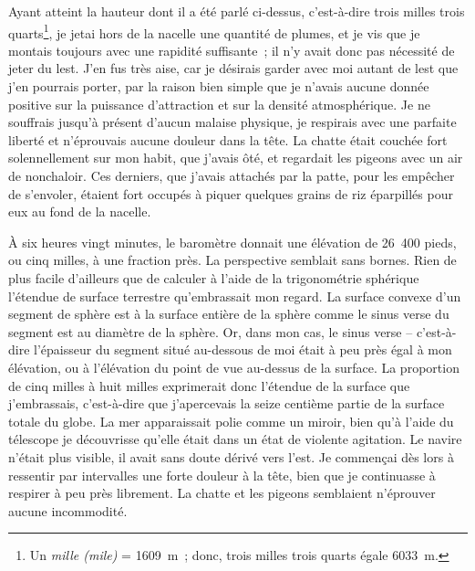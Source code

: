 \documentclass[french,twoside]{book} %
\begin{document}
Ayant atteint la hauteur dont il a été parlé ci-dessus, c’est-à-dire trois milles trois quarts\footnote{Un \emph{mille (mile)} = 1609 m ; donc, trois milles trois quarts égale 6033 m.}, je jetai hors de la nacelle une quantité de plumes, et je vis que je montais toujours avec une rapidité suffisante ; il n’y avait donc pas nécessité de jeter du lest. J’en fus très aise, car je désirais garder avec moi autant de lest que j’en pourrais porter, par la raison bien simple que je n’avais aucune donnée positive sur la puissance d’attraction et sur la densité atmosphérique. Je ne souffrais jusqu’à présent d’aucun malaise physique, je respirais avec une parfaite liberté et n’éprouvais aucune douleur dans la tête. La chatte était couchée fort solennellement sur mon habit, que j’avais ôté, et regardait les pigeons avec un air de nonchaloir. Ces derniers, que j’avais attachés par la patte, pour les empêcher de s’envoler, étaient fort occupés à piquer quelques grains de riz éparpillés pour eux au fond de la nacelle.\par
À six heures vingt minutes, le baromètre donnait une élévation de 26 400 pieds, ou cinq milles, à une fraction près. La perspective semblait sans bornes. Rien de plus facile d’ailleurs que de calculer à l’aide de la trigonométrie sphérique l’étendue de surface terrestre qu’embrassait mon regard. La surface convexe d’un segment de sphère est à la surface entière de la sphère comme le sinus verse du segment est au diamètre de la sphère. Or, dans mon cas, le sinus verse – c’est-à-dire l’épaisseur du segment situé au-dessous de moi était à peu près égal à mon élévation, ou à l’élévation du point de vue au-dessus de la surface. La proportion de cinq milles à huit milles exprimerait donc l’étendue de la surface que j’embrassais, c’est-à-dire que j’apercevais la seize centième partie de la surface totale du globe. La mer apparaissait polie comme un miroir, bien qu’à l’aide du télescope je découvrisse qu’elle était dans un état de violente agitation. Le navire n’était plus visible, il avait sans doute dérivé vers l’est. Je commençai dès lors à ressentir par intervalles une forte douleur à la tête, bien que je continuasse à respirer à peu près librement. La chatte et les pigeons semblaient n’éprouver aucune incommodité.\par
\end{document}
